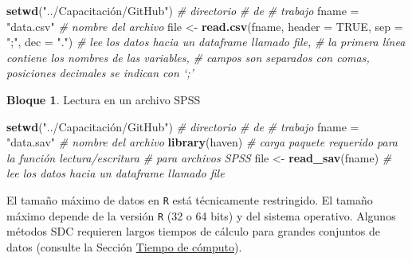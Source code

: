 \documentclass[]{book}
\newenvironment{Shaded}{\begin{snugshade}}{\end{snugshade}}
\newcommand{\CommentTok}[1]{\textcolor[rgb]{0.56,0.35,0.01}{\textit{#1}}}
\newcommand{\DataTypeTok}[1]{\textcolor[rgb]{0.13,0.29,0.53}{#1}}
\newcommand{\KeywordTok}[1]{\textcolor[rgb]{0.13,0.29,0.53}{\textbf{#1}}}
\newcommand{\NormalTok}[1]{#1}
\newcommand{\OtherTok}[1]{\textcolor[rgb]{0.56,0.35,0.01}{#1}}
\newcommand{\StringTok}[1]{\textcolor[rgb]{0.31,0.60,0.02}{#1}}
\theoremstyle{definition}
\theoremstyle{definition}
\newtheorem{example}{Bloque}[chapter]
\theoremstyle{definition}
\theoremstyle{definition}
\theoremstyle{remark}
\begin{document}
\begin{Shaded}
\begin{Highlighting}[]
\KeywordTok{setwd}\NormalTok{(}\StringTok{"../Capacitación/GitHub"}\NormalTok{) }\CommentTok{# directorio }
                                                                              \CommentTok{# de}
                                                                              \CommentTok{# trabajo}
\NormalTok{fname =}\StringTok{ "data.csv"} \CommentTok{# nombre del archivo}
\NormalTok{file <-}\StringTok{ }\KeywordTok{read.csv}\NormalTok{(fname, }\DataTypeTok{header =} \OtherTok{TRUE}\NormalTok{, }\DataTypeTok{sep =} \StringTok{";"}\NormalTok{, }\DataTypeTok{dec =} \StringTok{"."}\NormalTok{)}
\CommentTok{# lee los datos hacia un dataframe llamado file,}
\CommentTok{# la primera línea contiene los nombres de las variables,}
\CommentTok{# campos son separados con comas, posiciones decimales se indican con ‘;’}
\end{Highlighting}
\end{Shaded}

\begin{example}
\protect\hypertarget{exm:bloqueMicro5}{}{\label{exm:bloqueMicro5} }Lectura en un archivo SPSS
\end{example}

\begin{Shaded}
\begin{Highlighting}[]
\KeywordTok{setwd}\NormalTok{(}\StringTok{"../Capacitación/GitHub"}\NormalTok{) }\CommentTok{# directorio }
                                                                              \CommentTok{# de}
                                                                              \CommentTok{# trabajo}
\NormalTok{fname =}\StringTok{ "data.sav"} \CommentTok{# nombre del archivo}
\KeywordTok{library}\NormalTok{(haven) }\CommentTok{# carga paquete requerido para la función lectura/escritura}
               \CommentTok{# para archivos SPSS}
\NormalTok{file <-}\StringTok{ }\KeywordTok{read_sav}\NormalTok{(fname)}
\CommentTok{# lee los datos hacia un dataframe llamado file}
\end{Highlighting}
\end{Shaded}

El tamaño máximo de datos en \texttt{R} está técnicamente restringido. El tamaño máximo depende de la versión \texttt{R} (32 o 64 bits) y del sistema operativo. Algunos métodos SDC requieren largos tiempos de cálculo para grandes conjuntos de datos (consulte la Sección \protect\hyperlink{tiempo-de-cuxf3mputo}{Tiempo de cómputo}).
\end{document}
